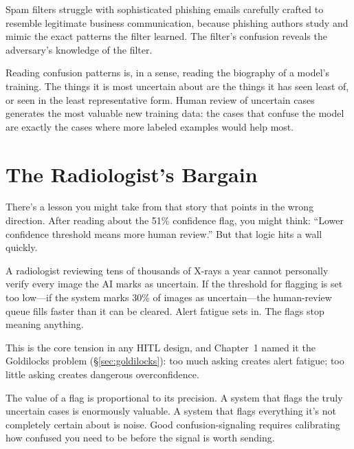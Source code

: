 Spam filters struggle with sophisticated phishing emails carefully crafted to resemble legitimate business communication, because phishing authors study and mimic the exact patterns the filter learned. The filter's confusion reveals the adversary's knowledge of the filter.

\begin{examplebox}
Reading confusion patterns is, in a sense, reading the biography of a model's training. The things it is most uncertain about are the things it has seen least of, or seen in the least representative form. Human review of uncertain cases generates the most valuable new training data: the cases that confuse the model are exactly the cases where more labeled examples would help most.
\end{examplebox}

\section{The Radiologist's Bargain}

There's a lesson you might take from that story that points in the wrong direction. After reading about the 51\% confidence flag, you might think: ``Lower confidence threshold means more human review.'' But that logic hits a wall quickly.

A radiologist reviewing tens of thousands of X-rays a year cannot personally verify every image the AI marks as uncertain. If the threshold for flagging is set too low---if the system marks 30\% of images as uncertain---the human-review queue fills faster than it can be cleared. Alert fatigue sets in. The flags stop meaning anything.

This is the core tension in any HITL design, and Chapter~1 named it the Goldilocks problem (\S\ref{sec:goldilocks}): too much asking creates alert fatigue; too little asking creates dangerous overconfidence.

\begin{keyconcept}
The value of a flag is proportional to its precision. A system that flags the truly uncertain cases is enormously valuable. A system that flags everything it's not completely certain about is noise. Good confusion-signaling requires calibrating how confused you need to be before the signal is worth sending.
\end{keyconcept}

